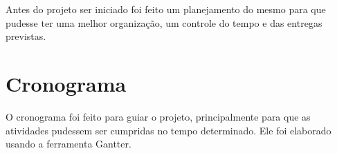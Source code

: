 Antes do projeto ser iniciado foi feito um planejamento do mesmo para que pudesse ter uma melhor organização, um controle do tempo e das entregas previstas.

\section{Cronograma}

O cronograma foi feito para guiar o projeto, principalmente para que as atividades pudessem ser cumpridas no tempo determinado. Ele foi elaborado usando a ferramenta Gantter.
